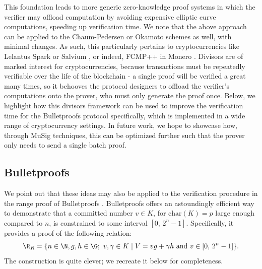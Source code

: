 \documentclass[11pt,letterpaper]{article}
\theoremstyle{definition}
\newcommand{\6}{\mathbf}
\newcommand{\7}{\mathcal}
\begin{document}
This foundation leads to more generic zero-knowledge proof systems in which the verifier may offload computation by avoiding expensive elliptic curve computations, speeding up verification time.
We note that the above approach can be applied to the Chaum-Pedersen \cite{ChaumPedersen} or Okamoto \cite{Okamoto} schemes as well, with minimal changes.
As such, this particularly pertains to cryptocurrencies like Lelantus Spark \cite{LelantusSpark} or Salvium \cite{Salvium}, or indeed, FCMP++ in Monero \cite{FCMP}.
Divisors are of marked interest for cryptocurrencies, because transactions must be repeatedly verifiable over the life of the blockchain - a single proof will be verified a great many times, so it behooves the protocol designers to offload the verifier's computations onto the prover, who must only generate the proof once.
Below, we highlight how this divisors framework can be used to improve the verification time for the Bulletproofs protocol \cite{Bullet} specifically, which is implemented in a wide range of cryptocurrency settings. In future work, we hope to showcase how, through MuSig techniques, this can be optimized further such that the prover only needs to send a single batch proof.














\subsection{Bulletproofs}

We point out that these ideas may also be applied to the verification procedure in the range proof of Bulletproofs \cite{Bullet}.
Bulletproofs offers an astoundingly efficient way to demonstrate that a committed number $v \in K$, for $\text{char}(K) = p$ large enough compared to $n$, is constrained to some interval $[0, \, 2^n-1]$. Specifically, it provides a proof of the following relation:
$$\R_{R} = \{n \in \N, g, h \in \G; \ v, \gamma \in K \mid V = vg + \gamma h \text{ and } v \in [0, \, 2^n-1]\}.$$
The construction is quite clever; we recreate it below for completeness.
\end{document}
